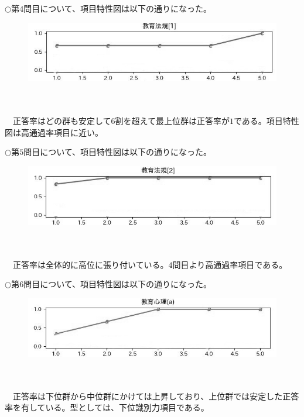 \documentclass[12pt]{jarticle}
\numberwithin{equation}{subsection}
\begin{document}
$\bigcirc$第$4$問目について、項目特性図は以下の通りになった。
\vspace{1cm}
\begin{figure}[H]
  \includegraphics[bb = -50 60 1 1,scale = 0.6]{Figure_4.jpg}
\end{figure}
\leavevmode \\
\\
\ \ 正答率はどの群も安定して$6$割を超えて最上位群は正答率が$1$である。項目特性図は高通過率項目に近い。

$\bigcirc$第$5$問目について、項目特性図は以下の通りになった。
\vspace{1cm}
\begin{figure}[H]
  \includegraphics[bb = -50 60 1 1,scale = 0.6]{Figure_5.jpg}
\end{figure}
\leavevmode \\
\\
\ \ 正答率は全体的に高位に張り付いている。$4$問目より高通過率項目である。

$\bigcirc$第$6$問目について、項目特性図は以下の通りになった。
\vspace{1cm}
\begin{figure}[H]
  \includegraphics[bb = -50 60 1 1,scale = 0.6]{Figure_6.jpg}
\end{figure}
\leavevmode \\
\\
\ \ 正答率は下位群から中位群にかけては上昇しており、上位群では安定した正答率を有している。型としては、下位識別力項目である。
\end{document}
